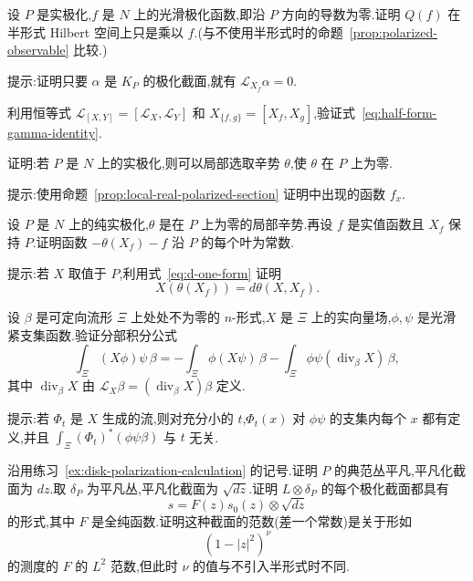 {\begin{exercise}[极化函数的半形式量子化]\label{ex:half-form-polarized-function}
设 $P$ 是实极化,$f$ 是 $N$ 上的光滑极化函数,即沿 $P$ 方向的导数为零.证明 $Q(f)$ 在半形式 Hilbert 空间上只是乘以 $f$.(与不使用半形式时的命题~\ref{prop:polarized-observable} 比较.)

提示:证明只要 $\alpha$ 是 $K_P$ 的极化截面,就有 $\mathcal L_{X_f}\alpha=0$.
\end{exercise}

\begin{exercise}[半形式交换子中的函数恒等式]\label{ex:half-form-gamma-identity}
利用恒等式 $\mathcal L_{[X,Y]}=[\mathcal L_X,\mathcal L_Y]$ 和 $X_{\{f,g\}}=[X_f,X_g]$,验证式~\eqref{eq:half-form-gamma-identity}.
\end{exercise}

\begin{exercise}[沿实极化消失的辛势]\label{ex:local-potential-vanishing-polarization}
证明:若 $P$ 是 $N$ 上的实极化,则可以局部选取辛势 $\theta$,使 $\theta$ 在 $P$ 上为零.

提示:使用命题~\ref{prop:local-real-polarized-section} 证明中出现的函数 $f_x$.
\end{exercise}

\begin{exercise}[叶上的常值函数]\label{ex:observable-leaf-constant}
设 $P$ 是 $N$ 上的纯实极化,$\theta$ 是在 $P$ 上为零的局部辛势.再设 $f$ 是实值函数且 $X_f$ 保持 $P$.证明函数 $-\theta(X_f)-f$ 沿 $P$ 的每个叶为常数.

提示:若 $X$ 取值于 $P$,利用式~\eqref{eq:d-one-form} 证明
\[
 X(\theta(X_f))=d\theta(X,X_f).
\]
\end{exercise}

\begin{exercise}[叶空间上的分部积分]\label{ex:integration-by-parts-leaf-space}
设 $\beta$ 是可定向流形 $\Xi$ 上处处不为零的 $n$-形式,$X$ 是 $\Xi$ 上的实向量场,$\phi,\psi$ 是光滑紧支集函数.验证分部积分公式
\[
 \int_\Xi(X\phi)\psi\,\beta
 =-\int_\Xi\phi(X\psi)\,\beta
 -\int_\Xi\phi\psi(\operatorname{div}_\beta X)\,\beta,
\]
其中 $\operatorname{div}_\beta X$ 由 $\mathcal L_X\beta=(\operatorname{div}_\beta X)\beta$ 定义.

提示:若 $\Phi_t$ 是 $X$ 生成的流,则对充分小的 $t$,$\Phi_t(x)$ 对 $\phi\psi$ 的支集内每个 $x$ 都有定义,并且 $\int_\Xi(\Phi_t)^*(\phi\psi\beta)$ 与 $t$ 无关.
\end{exercise}

\begin{exercise}[圆盘的半形式内积]\label{ex:disk-half-form-inner-product}
沿用练习~\ref{ex:disk-polarization-calculation} 的记号.证明 $P$ 的典范丛平凡,平凡化截面为 $dz$.取 $\delta_P$ 为平凡丛,平凡化截面为 $\sqrt{dz}$.证明 $L\otimes\delta_P$ 的每个极化截面都具有
\[
 s=F(z)s_0(z)\otimes\sqrt{dz}
\]
的形式,其中 $F$ 是全纯函数.证明这种截面的范数(差一个常数)是关于形如
\[
 (1-|z|^2)^\nu
\]
的测度的 $F$ 的 $L^2$ 范数,但此时 $\nu$ 的值与不引入半形式时不同.
\end{exercise}

}
